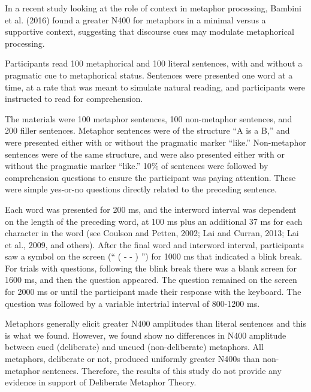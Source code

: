 \documentclass[]{article}
\begin{document}
	In a recent study looking at the role of context in metaphor processing, Bambini et al. (2016) found a greater N400 for metaphors in a minimal versus a supportive context, suggesting that discourse cues may modulate metaphorical processing.
	
	Participants read 100 metaphorical and 100 literal sentences, with and without a pragmatic cue to metaphorical status.
	Sentences were presented one word at a time, at a rate that was meant to simulate natural reading, and participants were instructed to read for comprehension.
	
	The materials were 100 metaphor sentences, 100 non-metaphor sentences, and 200 filler sentences. Metaphor sentences were of the structure “A is a B,” and were presented either with or without the pragmatic marker “like.” 
	Non-metaphor sentences were of the same structure, and were also presented either with or without the pragmatic marker “like.”
	10\% of sentences were followed by comprehension questions to ensure the participant was paying attention. These were simple yes-or-no questions directly related to the preceding sentence.
	
	Each word was presented for 200 ms, and the interword interval was dependent on the length of the preceding word, at 100 ms plus an additional 37 ms for each character in the word (see Coulson and Petten, 2002; Lai and Curran, 2013; Lai et al., 2009, and others). After the final word and interword interval, participants saw a symbol on the screen (“ ( - - ) ”) for 1000 ms that indicated a blink break. For trials with questions, following the blink break there was a blank screen for 1600 ms, and then the question appeared. The question remained on the screen for 2000 ms or until the participant made their response with the keyboard. The question was followed by a variable intertrial interval of 800-1200 ms.
	
	Metaphors generally elicit greater N400 amplitudes than literal sentences and this is what we found.
	However, we found show no differences in N400 amplitude between cued (deliberate) and uncued (non-deliberate) metaphors. 
	All metaphors, deliberate or not, produced uniformly greater N400s than non-metaphor sentences. Therefore, the results of this study do not provide any evidence in support of Deliberate Metaphor Theory. 
	
\printbibliography
\end{document}
